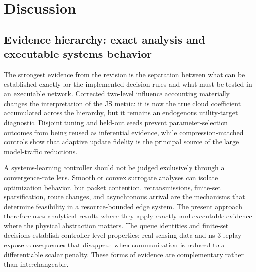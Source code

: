 \documentclass[11pt]{article}
\begin{document}
\section{Discussion}
\subsection*{Evidence hierarchy: exact analysis and executable systems behavior}
The strongest evidence from the revision is the separation between what can be established exactly for the implemented decision rules and what must be tested in an executable network. Corrected two-level influence accounting materially changes the interpretation of the JS metric: it is now the true cloud coefficient accumulated across the hierarchy, but it remains an endogenous utility-target diagnostic. Disjoint tuning and held-out seeds prevent parameter-selection outcomes from being reused as inferential evidence, while compression-matched controls show that adaptive update fidelity is the principal source of the large model-traffic reductions.\par
A systems-learning controller should not be judged exclusively through a convergence-rate lens. Smooth or convex surrogate analyses can isolate optimization behavior, but packet contention, retransmissions, finite-set sparsification, route changes, and asynchronous arrival are the mechanisms that determine feasibility in a resource-bounded edge system. The present approach therefore uses analytical results where they apply exactly and executable evidence where the physical abstraction matters. The queue identities and finite-set decisions establish controller-level properties; real sensing data and ns-3 replay expose consequences that disappear when communication is reduced to a differentiable scalar penalty. These forms of evidence are complementary rather than interchangeable.\par
\end{document}
